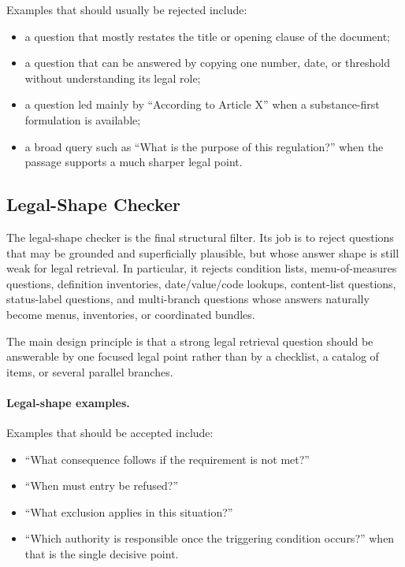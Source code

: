 Examples that should usually be rejected include:
\begin{itemize}
\item a question that mostly restates the title or opening clause of the document;
\item a question that can be answered by copying one number, date, or threshold without understanding its legal role;
\item a question led mainly by ``According to Article X'' when a substance-first formulation is available;
\item a broad query such as ``What is the purpose of this regulation?'' when the passage supports a much sharper legal point.
\end{itemize}

\subsection{Legal-Shape Checker}

The legal-shape checker is the final structural filter. Its job is to reject questions that may be grounded and superficially plausible, but whose answer shape is still weak for legal retrieval. In particular, it rejects condition lists, menu-of-measures questions, definition inventories, date/value/code lookups, content-list questions, status-label questions, and multi-branch questions whose answers naturally become menus, inventories, or coordinated bundles.

The main design principle is that a strong legal retrieval question should be answerable by one focused legal point rather than by a checklist, a catalog of items, or several parallel branches.

\paragraph{Legal-shape examples.}
Examples that should be accepted include:
\begin{itemize}
\item ``What consequence follows if the requirement is not met?''
\item ``When must entry be refused?''
\item ``What exclusion applies in this situation?''
\item ``Which authority is responsible once the triggering condition occurs?'' when that is the single decisive point.
\end{itemize}


